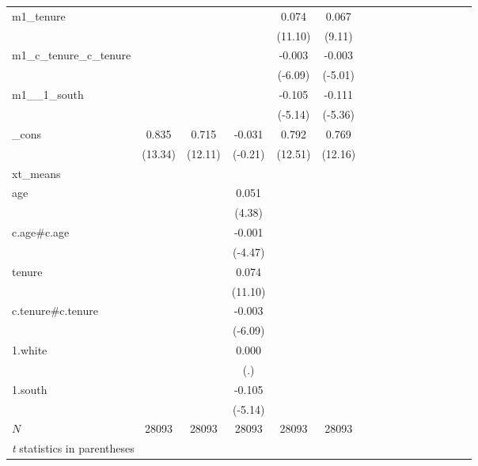 \documentclass[bib]{statapress}
\begin{document}
\begin{table}[H]
{\begin{tabular}{l*{5}{c}cccccccccc}
m1\_tenure   &            &            &            &       0.074&       0.067\\
            &            &            &            &     (11.10)&      (9.11)\\
m1\_c\_tenure\_c\_tenure&            &            &            &      -0.003&      -0.003\\
            &            &            &            &     (-6.09)&     (-5.01)\\
m1\_\_1\_south &            &            &            &      -0.105&      -0.111\\
            &            &            &            &     (-5.14)&     (-5.36)\\
\_cons      &       0.835&       0.715&      -0.031&       0.792&       0.769\\
            &     (13.34)&     (12.11)&     (-0.21)&     (12.51)&     (12.16)\\
\hline
xt\_means    &            &            &            &            &            \\
age         &            &            &       0.051&            &            \\
            &            &            &      (4.38)&            &            \\
c.age\#c.age &            &            &      -0.001&            &            \\
            &            &            &     (-4.47)&            &            \\
tenure      &            &            &       0.074&            &            \\
            &            &            &     (11.10)&            &            \\
c.tenure\#c.tenure&            &            &      -0.003&            &            \\
            &            &            &     (-6.09)&            &            \\
1.white     &            &            &       0.000&            &            \\
            &            &            &         (.)&            &            \\
1.south     &            &            &      -0.105&            &            \\
            &            &            &     (-5.14)&            &            \\
\hline
\(N\)       &       28093&       28093&       28093&       28093&       28093\\
\hline\hline
\multicolumn{6}{l}{\footnotesize \textit{t} statistics in parentheses}\\
\end{tabular}

}

\end{table}%
\end{document}

